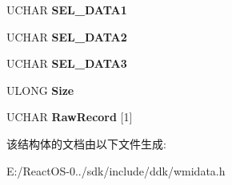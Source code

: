 \begin{DoxyCompactItemize}
\mbox{\label{struct___m_s_m_c_a_event___system_event_error_a1f3baa65eefcab93eb82b763342a761a}} 
U\+C\+H\+AR {\bfseries S\+E\+L\+\_\+\+D\+A\+T\+A1}
\item 
\mbox{\label{struct___m_s_m_c_a_event___system_event_error_a7454e98300f3621301e4fb8cfbc1485b}} 
U\+C\+H\+AR {\bfseries S\+E\+L\+\_\+\+D\+A\+T\+A2}
\item 
\mbox{\label{struct___m_s_m_c_a_event___system_event_error_ae5d006bfad5247ddd2bf271f89299be1}} 
U\+C\+H\+AR {\bfseries S\+E\+L\+\_\+\+D\+A\+T\+A3}
\item 
\mbox{\label{struct___m_s_m_c_a_event___system_event_error_a920585d4be045b3785b48e72065477f3}} 
U\+L\+O\+NG {\bfseries Size}
\item 
\mbox{\label{struct___m_s_m_c_a_event___system_event_error_af225b612d9b8a62bbce69a7a62c8caf4}} 
U\+C\+H\+AR {\bfseries Raw\+Record} \mbox{[}1\mbox{]}
\end{DoxyCompactItemize}


该结构体的文档由以下文件生成\+:\begin{DoxyCompactItemize}
\item 
E\+:/\+React\+O\+S-\/0../sdk/include/ddk/wmidata.\+h\end{DoxyCompactItemize}
